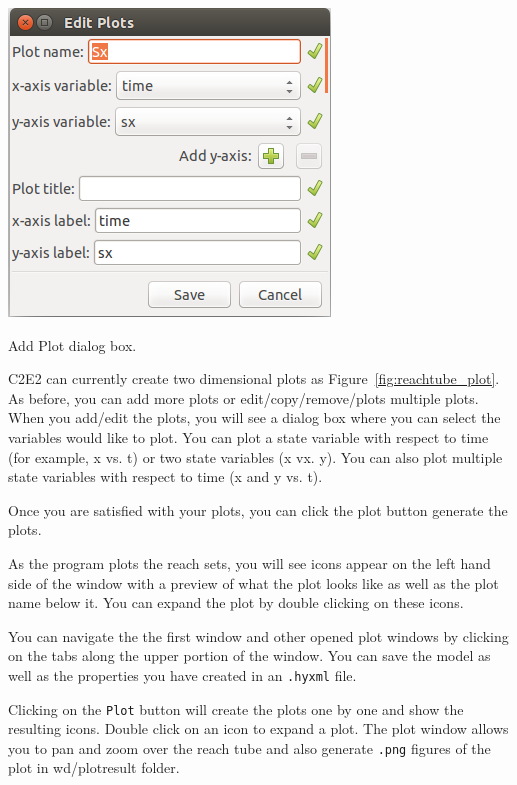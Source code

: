 \documentclass{tufte-book} %
\begin{document}
\begin{marginfigure}
 \centerline{\includegraphics[scale=.24,keepaspectratio=true]{Manual_ver0_2_image/plot_dialog.png}}
 \caption{Add Plot dialog box.} 
 \label{fig:plot_dialog}
\end{marginfigure}


%
C2E2 can currently create two dimensional plots as Figure~\ref{fig:reachtube_plot}. As before, you can add more plots or edit/copy/remove/plots multiple plots. 
When you add/edit the plots, you will see a dialog box where you can select the variables would like to plot.
You can plot a state variable with respect to time (for example, x vs. t) or two state variables (x vx. y).
You can also plot multiple state variables with respect to time (x and y vs. t). 

Once you are satisfied with your plots, you can click the plot button generate the plots. 


As the program plots the reach sets, you will see icons appear on the left hand side of the window with a preview of what the plot looks like as well as the plot name below it. You can expand the plot by double clicking on these icons.

You can navigate the the first window and other opened plot windows by clicking on the tabs along the upper portion of the window. You can save the model as well as the properties you have created in an \texttt{.hyxml} file. 


Clicking on the \texttt{Plot} button will create 
the plots one by one and show the resulting icons.
Double click on an icon to expand a plot. The plot window allows you to pan and zoom over the reach tube and also generate \texttt{.png} figures of the plot in wd/plotresult folder.
\end{document}
